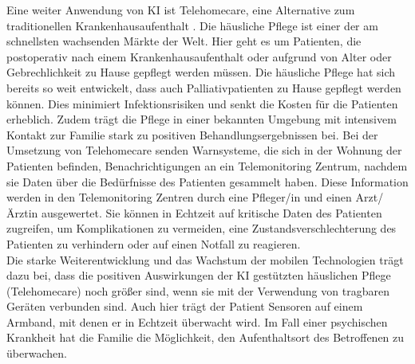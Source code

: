 Eine weiter Anwendung von KI ist Telehomecare, eine Alternative zum traditionellen Krankenhausaufenthalt \cite{Chapter_14}. Die häusliche Pflege ist einer der am schnellsten wachsenden Märkte der Welt.\cite{Chapter_14} Hier geht es um Patienten, die postoperativ nach einem Krankenhausaufenthalt oder aufgrund von Alter oder Gebrechlichkeit zu Hause gepflegt werden müssen. Die häusliche Pflege hat sich bereits so weit entwickelt, dass auch Palliativpatienten zu Hause gepflegt werden können. Dies minimiert Infektionsrisiken und senkt die Kosten für die Patienten erheblich. Zudem trägt die Pflege in einer bekannten Umgebung mit intensivem Kontakt zur Familie stark zu positiven Behandlungsergebnissen bei.
Bei der Umsetzung von Telehomecare senden Warnsysteme, die sich in der Wohnung der Patienten befinden, Benachrichtigungen an ein Telemonitoring Zentrum, nachdem sie Daten über die Bedürfnisse des Patienten gesammelt haben.\cite{Chapter_14} Diese Information werden in den Telemonitoring Zentren durch eine Pfleger/in und einen Arzt/Ärztin ausgewertet. Sie können in Echtzeit auf kritische Daten des Patienten zugreifen, um Komplikationen zu vermeiden, eine Zustandsverschlechterung des Patienten zu verhindern oder auf einen Notfall zu reagieren.\cite{Chapter_14}\\
Die starke Weiterentwicklung und das Wachstum der mobilen Technologien trägt dazu bei, dass die positiven Auswirkungen der KI gestützten häuslichen Pflege (Telehomecare) noch größer sind, wenn sie mit der Verwendung von tragbaren Geräten verbunden sind. Auch hier trägt der Patient Sensoren auf einem Armband, mit denen er in Echtzeit überwacht wird. Im Fall einer psychischen Krankheit hat die Familie die Möglichkeit, den Aufenthaltsort des Betroffenen zu überwachen.\cite{Chapter_14}\\ 